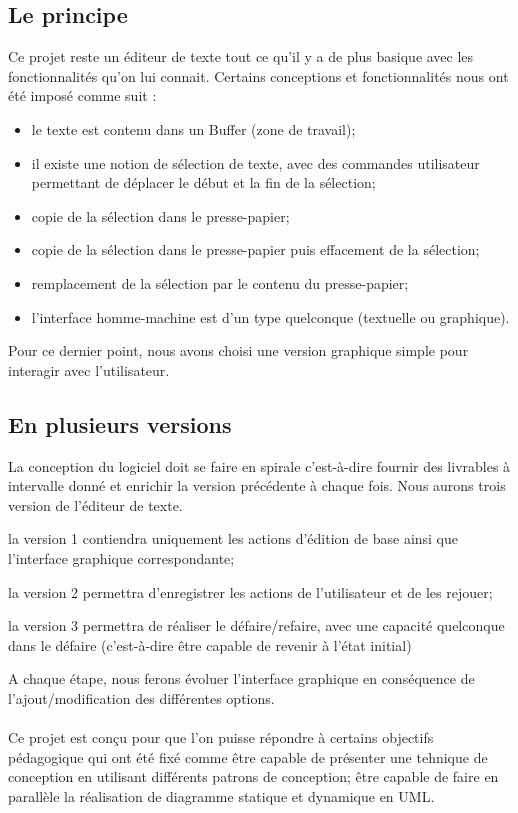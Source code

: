 \documentclass[a4paper,11pt]{article}
\begin{document}
\subsection{Le principe}
Ce projet reste un éditeur de texte tout ce qu'il y a de plus basique avec les fonctionnalités qu'on lui connait. Certains conceptions et fonctionnalités nous ont été imposé comme suit : 
\begin{itemize}
\item le texte est contenu dans un Buffer (zone de travail);
\item il existe une notion de sélection de texte, avec des commandes utilisateur permettant de déplacer le début et la fin de la sélection; 
\item copie de la sélection dans le presse-papier; 
\item copie de la sélection dans le presse-papier puis effacement de la sélection;
\item remplacement de la sélection par le contenu du presse-papier;
\item l'interface homme-machine est d'un type quelconque (textuelle ou graphique).
\end{itemize}
Pour ce dernier point, nous avons choisi une version graphique simple pour interagir avec l'utilisateur.

\subsection{En plusieurs versions}
La conception du logiciel doit se faire en spirale c'est-à-dire fournir des livrables à intervalle donné et enrichir la version précédente à chaque fois. Nous aurons trois version de l'éditeur de texte. 
\begin{description}
\item la version 1 contiendra uniquement les actions d'édition de base ainsi que l'interface graphique correspondante;
\item la version 2 permettra d'enregistrer les actions de l'utilisateur et de les rejouer;
\item la version 3 permettra de réaliser le défaire/refaire, avec une capacité quelconque dans le défaire (c'est-à-dire être capable de revenir à l'état initial)
\end{description}
A chaque étape, nous ferons évoluer l'interface graphique en conséquence de l'ajout/modification des différentes options.

\paragraph{}
Ce projet est conçu pour que l'on puisse répondre à certains objectifs pédagogique qui ont été fixé comme être capable de présenter une tehnique de conception en utilisant différents patrons de conception; être capable de faire en parallèle la réalisation de diagramme statique et dynamique en UML.
\end{document}

